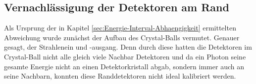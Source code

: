 \documentclass[a4paper,11pt,oneside,final,german,openbib,pdftex]{scrbook}
\begin{document}
{%




\subsection{Vernachl\"assigung der Detektoren am Rand}
\label{sec:Varnachlaessigung-der-Detektoren-am-Rand}

Als Ursprung der in Kapitel \ref{sec:Energie-Interval-Abhaengigkeit} ermittelten Abweichung wurde zun\"achst der Aufbau des Crystal-Balls vermutet. Genauer gesagt, der Strahlenein und -ausgang. Denn durch diese hatten die Detektoren im Crystal-Ball nicht alle gleich viele Nachbar Detektoren und da ein Photon seine gesamte Energie nicht an einen Detektorkristall abgab, sondern immer auch an seine Nachbarn, konnten diese Randdetektoren nicht ideal kalibriert werden. 




}
\end{document}
